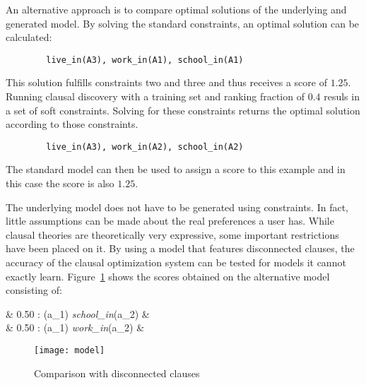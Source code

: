 \begin{experiment}
\label{exp:co_acc_optimal_solution}
	An alternative approach is to compare optimal solutions of the underlying and generated model.
	By solving the standard constraints, an optimal solution can be calculated:
	\begin{verbatim}
		live_in(A3), work_in(A1), school_in(A1)
	\end{verbatim}
	This solution fulfills constraints two and three and thus receives a score of $1.25$.
	Running clausal discovery with a training set and ranking fraction of $0.4$ resuls in a set of soft constraints.
	Solving for these constraints returns the optimal solution according to those constraints.
	\begin{verbatim}
		live_in(A3), work_in(A2), school_in(A2)
	\end{verbatim}
	The standard model can then be used to assign a score to this example and in this case the score is also $1.25$.
\end{experiment}

\begin{experiment}
	The underlying model does not have to be generated using constraints.
	In fact, little assumptions can be made about the real preferences a user has.
	While clausal theories are theoretically very expressive, some important restrictions have been placed on it.
	By using a model that features disconnected clauses, the accuracy of the clausal optimization system can be tested for models it cannot exactly learn.
	Figure~\ref{fig:co_acc_model} shows the scores obtained on the alternative model consisting of:

	\begin{shiftedflalign*}
		& \text{ }0.50 :  \leftarrow {}(a_1) \land \textit{school\_in}(a_2) & \\
		& \text{ }0.50 :  \leftarrow {}(a_1) \land \textit{work\_in}(a_2) &
	\end{shiftedflalign*}

	\begin{figure}

		\caption{Comparison with disconnected clauses}
		\centering
			\texttt{[image: model]}
		\label{fig:co_acc_model}

	\end{figure}


\end{experiment}


